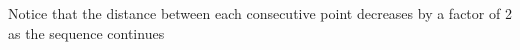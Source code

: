\documentclass[preview]{standalone}
\begin{document}
\begin{center}
Notice that the distance between each consecutive point decreases by a factor of 2 as the sequence continues
\end{center}
\end{document}
